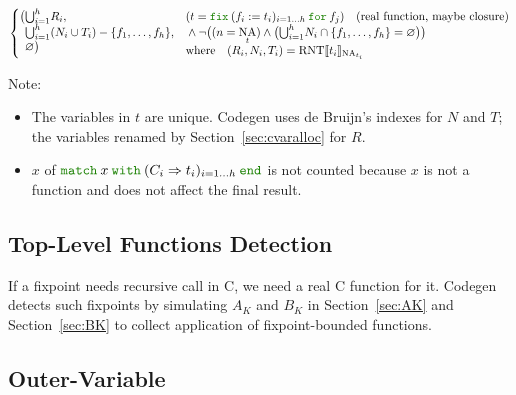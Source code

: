 \documentclass[a4paper,fleqn]{article}
\def\codegen{\textrm{Codegen}}
\newcommand{\kwmatch}{\mbox{\color{mygreen}\ttfamily match}}
\newcommand{\kwwith}{\mbox{\color{mygreen}\ttfamily with}}
\newcommand{\kwend}{\mbox{\color{mygreen}\ttfamily end}}
\newcommand{\kwfix}{\mbox{\color{mygreen}\ttfamily fix}}
\newcommand{\kwfor}{\mbox{\color{mygreen}\ttfamily for}}
\newcommand{\match}[4]{\kwmatch\:#1\:\kwwith\:(#2 \Rightarrow #3)_{#4}\:\kwend}
\newcommand{\fix}[4]{\kwfix\:(#1 := #2)_{#3}\:\kwfor\:#4}
\DeclareMathOperator{\NA}{NA} %
\newcommand{\tbigcup}{{\textstyle\bigcup}}
\newcommand{\BRA}[1]{\llbracket #1 \rrbracket}
\DeclareMathOperator{\RNTop}{RNT}
\newcommand{\RNT}[2]{\RNTop\BRA{#1}_{#2}}
\newcommand{\secref}[1]{Section~\ref{#1}}
\begin{document}
\begin{align*}
\begin{cases}
    \begin{aligned}[t]
      \bigl( & \tbigcup_{i=1}^h R_i, \\
             & \tbigcup_{i=1}^h (N_i \cup T_i) - \{f_1,\dotsc, f_h\}, \\
             & \varnothing \bigr)
    \end{aligned} &
      \begin{aligned}[t]
        & (t = \fix{f_i}{t_i}{i=1\ldots h}{f_j}) \quad \text{(real function, maybe closure)} \\
        & {} \wedge \neg \bigl((n = \NA_t) \wedge \bigl(\tbigcup_{i=1}^h N_i \cap \{f_1,\dotsc, f_h\} = \varnothing\bigr)\bigr) \\
        & \text{where}\quad (R_i, N_i, T_i) = \RNT{t_i}{\NA_{t_i}}
      \end{aligned}
  \end{cases}
\end{align*}
{\small Note:
\begin{itemize}
  \item The variables in $t$ are unique.
    \codegen{} uses de Bruijn's indexes for $N$ and $T$;
    the variables renamed by \secref{sec:cvaralloc} for $R$.
  \item $x$ of $\match{x}{C_i}{t_i}{i=1\ldots h}$ is not counted because $x$ is not a function and does not affect the final result.
\end{itemize}}

\subsection{Top-Level Functions Detection}\label{sec:top-level-function-detection}
If a fixpoint needs recursive call in C, we need a real C function for it.
\codegen{} detects such fixpoints by simulating $A_K$ and $B_K$ in \secref{sec:AK} and \secref{sec:BK} to collect application of fixpoint-bounded functions.

\subsection{Outer-Variable}\label{sec:outer-variable}
\end{document}
